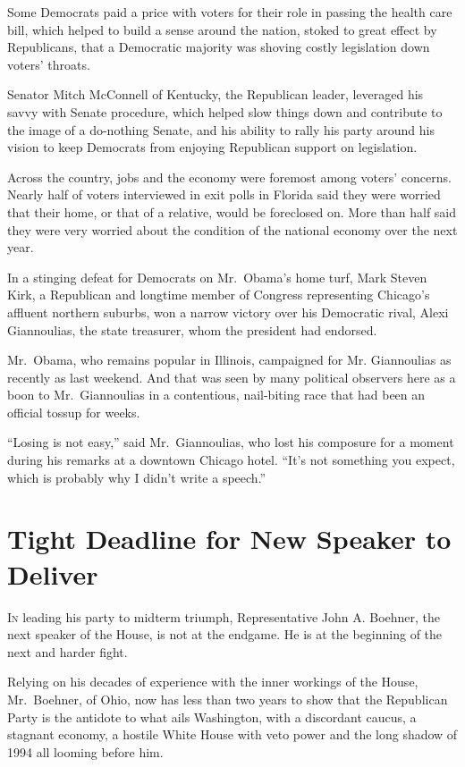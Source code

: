﻿\documentclass[12pt]{article}
\begin{document}
Some Democrats paid a price with voters for their role in passing the health care bill, which helped
to build a sense around the nation, stoked to great effect by Republicans, that a Democratic
majority was shoving costly legislation down voters' throats.

Senator Mitch McConnell of Kentucky, the Republican leader, leveraged his savvy with Senate
procedure, which helped slow things down and contribute to the image of a do-nothing Senate, and his
ability to rally his party around his vision to keep Democrats from enjoying Republican support on
legislation.

Across the country, jobs and the economy were foremost among voters' concerns. Nearly half of voters
interviewed in exit polls in Florida said they were worried that their home, or that of a relative,
would be foreclosed on. More than half said they were very worried about the condition of the
national economy over the next year.

In a stinging defeat for Democrats on Mr.~Obama's home turf, Mark Steven Kirk, a Republican and
longtime member of Congress representing Chicago's affluent northern suburbs, won a narrow victory
over his Democratic rival, Alexi Giannoulias, the state treasurer, whom the president had endorsed.

Mr.~Obama, who remains popular in Illinois, campaigned for Mr. Giannoulias as recently as last
weekend. And that was seen by many political observers here as a boon to Mr.~Giannoulias in a
contentious, nail-biting race that had been an official tossup for weeks.

``Losing is not easy,'' said Mr.~Giannoulias, who lost his composure for a moment during his remarks
at a downtown Chicago hotel. ``It's not something you expect, which is probably why I didn't write a
speech.''

\section{Tight Deadline for New Speaker to Deliver}

\lettrine{I}{n} leading his party to midterm triumph, Representative John A.
Boehner, the next speaker of the House, is not at the endgame. He is at the beginning of the next
and harder fight.

Relying on his decades of experience with the inner workings of the House, Mr.~Boehner, of Ohio, now
has less than two years to show that the Republican Party is the antidote to what ails Washington,
with a discordant caucus, a stagnant economy, a hostile White House with veto power and the long
shadow of 1994 all looming before him.
\end{document}
